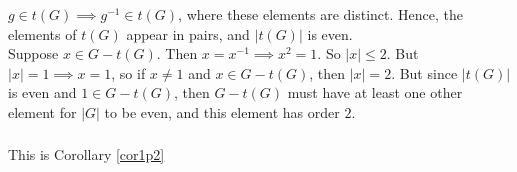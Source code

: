 \documentclass{article}
\newcommand{\inv}[1]{ {#1}^{-1} }
\begin{document}
\subsubsection{}
$g \in t(G) \implies \inv{g} \in t(G)$, where these elements are distinct. Hence, the elements of $t(G)$ appear in pairs, and $|t(G)|$ is even.\\
Suppose $x \in G-t(G)$. Then $x = \inv{x} \implies x^2 = 1$. So $|x| \leq 2$. But $|x|=1 \implies x=1$, so if $x \neq 1$ and $x \in G-t(G)$, then $|x| = 2$. But since $|t(G)|$ is even and $1 \in G-t(G)$, then $G-t(G)$ must have at least one other element for $|G|$ to be even, and this element has order $2$.
\subsubsection{}
This is Corollary \ref{cor1p2}
\end{document}
